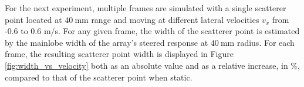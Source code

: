 For the next experiment, multiple frames are simulated with a single scatterer point located at $40~$mm range and moving at different lateral velocities $v_x$ from -0.6 to 0.6 m/s.
For any given frame, the width of the scatterer point is estimated by the mainlobe width of the array's steered response at $40~$mm radius. For each frame, the resulting scatterer point width is displayed in Figure \ref{fig:width_vs_velocity} both as an absolute value and as a relative increase, in $\%$, compared to that of the scatterer point when static.

